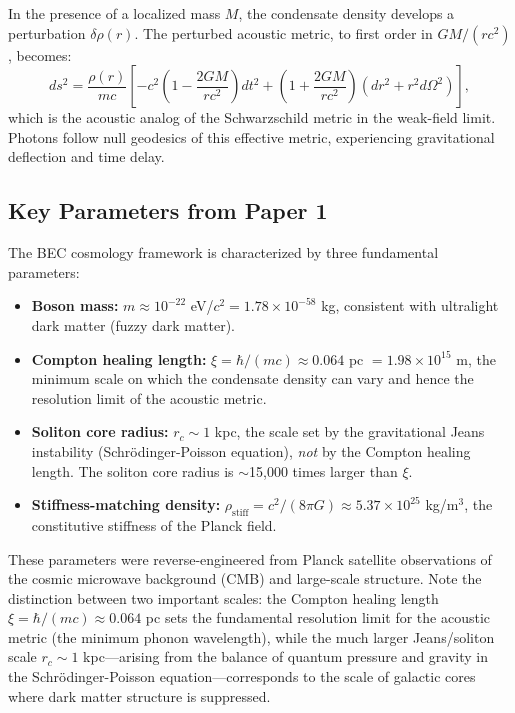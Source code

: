 \documentclass[11pt,a4paper]{article}
\newcommand{\ee}[1]{\times 10^{#1}}
\newcommand{\rhostiff}{\ensuremath{\rho_{\mathrm{stiff}}}}
\theoremstyle{definition}
\theoremstyle{remark}
\begin{document}
In the presence of a localized mass $M$, the condensate density develops a perturbation $\delta\rho(r)$. The perturbed acoustic metric, to first order in $GM/(rc^2)$, becomes:
\begin{equation}
\label{eq:perturbed_acoustic}
ds^2 = \frac{\rho(r)}{mc}\left[-c^2\left(1 - \frac{2GM}{rc^2}\right) dt^2 + \left(1 + \frac{2GM}{rc^2}\right)(dr^2 + r^2 d\Omega^2)\right],
\end{equation}
which is the acoustic analog of the Schwarzschild metric in the weak-field limit. Photons follow null geodesics of this effective metric, experiencing gravitational deflection and time delay.

\subsection{Key Parameters from Paper 1}
\label{sec:parameters}

The BEC cosmology framework is characterized by three fundamental parameters:
\begin{itemize}[leftmargin=*, itemsep=0.3em]
\item \textbf{Boson mass:} $m \approx 10^{-22}$ eV/$c^2 = 1.78 \ee{-58}$ kg, consistent with ultralight dark matter (fuzzy dark matter).
\item \textbf{Compton healing length:} $\xi = \hbar/(mc) \approx 0.064$ pc $= 1.98 \ee{15}$ m, the minimum scale on which the condensate density can vary and hence the resolution limit of the acoustic metric.
\item \textbf{Soliton core radius:} $r_c \sim 1$ kpc, the scale set by the gravitational Jeans instability (Schr\"odinger-Poisson equation), \emph{not} by the Compton healing length. The soliton core radius is $\sim$15{,}000 times larger than $\xi$.
\item \textbf{Stiffness-matching density:} $\rhostiff = c^2/(8\pi G) \approx 5.37 \ee{25}$ kg/m$^3$, the constitutive stiffness of the Planck field.
\end{itemize}

These parameters were reverse-engineered from Planck satellite observations of the cosmic microwave background (CMB) and large-scale structure. Note the distinction between two important scales: the Compton healing length $\xi = \hbar/(mc) \approx 0.064$ pc sets the fundamental resolution limit for the acoustic metric (the minimum phonon wavelength), while the much larger Jeans/soliton scale $r_c \sim 1$ kpc---arising from the balance of quantum pressure and gravity in the Schr\"odinger-Poisson equation---corresponds to the scale of galactic cores where dark matter structure is suppressed.
\end{document}
